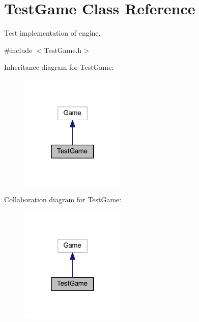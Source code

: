 \hypertarget{class_test_game}{}\section{Test\+Game Class Reference}
\label{class_test_game}


Test implementation of engine.  




{\ttfamily \#include $<$Test\+Game.\+h$>$}



Inheritance diagram for Test\+Game\+:\nopagebreak
\begin{figure}[H]
\begin{center}
\leavevmode
\includegraphics[width=142pt]{class_test_game__inherit__graph}
\end{center}
\end{figure}


Collaboration diagram for Test\+Game\+:\nopagebreak
\begin{figure}[H]
\begin{center}
\leavevmode
\includegraphics[width=142pt]{class_test_game__coll__graph}
\end{center}
\end{figure}
